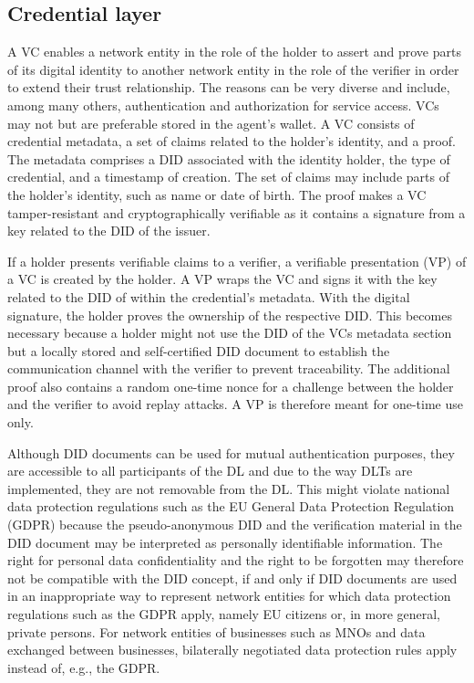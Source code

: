 \documentclass[conference]{IEEEtran}
\begin{document}


\subsection{Credential layer} %
A VC enables a network entity in the role of the holder to assert and prove parts of its digital identity to another network entity in the role of the verifier in order to extend their trust relationship. The reasons can be very diverse and include, among many others, authentication and authorization for service access. VCs may not but are preferable stored in the agent's wallet. A VC consists of credential metadata, a set of claims related to the holder's identity, and a proof. The metadata comprises a DID associated with the identity holder, the type of credential, and a timestamp of creation. The set of claims may include parts of the holder's identity, such as name or date of birth. The proof makes a VC tamper-resistant and cryptographically verifiable as it contains a signature from a key related to the DID of the issuer.

If a holder presents verifiable claims to a verifier, a verifiable presentation (VP) of a VC is created by the holder. A VP wraps the VC and signs it with the key related to the DID of within the credential's metadata. With the digital signature, the holder proves the ownership of the respective DID. This becomes necessary because a holder might not use the DID of the VCs metadata section but a locally stored and self-certified DID document to establish the communication channel with the verifier to prevent traceability. The additional proof also contains a random one-time nonce for a challenge between the holder and the verifier to avoid replay attacks. A VP is therefore meant for one-time use only.        

Although DID documents can be used for mutual authentication purposes, they are accessible to all participants of the DL and due to the way DLTs are implemented, they are not removable from the DL. This might violate national data protection regulations such as the EU General Data Protection Regulation (GDPR) because the pseudo-anonymous DID and the verification material in the DID document may be interpreted as personally identifiable information. The right for personal data confidentiality and the right to be forgotten may therefore not be compatible with the DID concept, if and only if DID documents are used in an inappropriate way to represent network entities for which data protection regulations such as the GDPR apply, namely EU citizens or, in more general, private persons. For network entities of businesses such as MNOs and data exchanged between businesses, bilaterally negotiated data protection rules apply instead of, e.g., the GDPR. 
\end{document}
